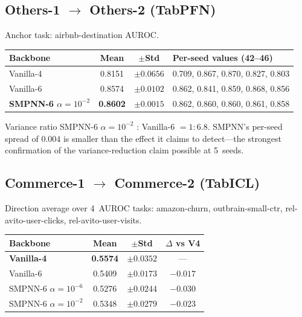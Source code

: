 \documentclass{article}
\begin{document}
\subsection{Others-1 $\to$ Others-2 (TabPFN)}
Anchor task: airbnb-destination AUROC.

\begin{table}[h]
  \centering
  \small
  \begin{tabular}{@{}lccL{5.2cm}@{}}
    \toprule
    Backbone                     & Mean   & $\pm$Std   & Per-seed values (42--46)              \\
    \midrule
    Vanilla-4                    & 0.8151 & $\pm 0.0656$ & 0.709, 0.867, 0.870, 0.827, 0.803    \\
    Vanilla-6                    & 0.8574 & $\pm 0.0102$ & 0.862, 0.841, 0.859, 0.868, 0.856    \\
    \textbf{SMPNN-6 $\alpha{=}10^{-2}$} & \textbf{0.8602} & \textbf{$\pm 0.0015$} & 0.862, 0.860, 0.860, 0.861, 0.858 \\
    \bottomrule
  \end{tabular}
\end{table}

Variance ratio SMPNN-6 $\alpha{=}10^{-2}$ : Vanilla-6 $= 1 : 6.8$. SMPNN's per-seed spread of $0.004$ is smaller than the effect it claims to detect---the strongest confirmation of the variance-reduction claim possible at 5~seeds.

\subsection{Commerce-1 $\to$ Commerce-2 (TabICL)}
Direction average over 4~AUROC tasks: amazon-churn, outbrain-small-ctr, rel-avito-user-clicks, rel-avito-user-visits.

\begin{table}[h]
  \centering
  \small
  \begin{tabular}{@{}lccc@{}}
    \toprule
    Backbone                        & Mean   & $\pm$Std   & $\Delta$ vs V4 \\
    \midrule
    \textbf{Vanilla-4}              & \textbf{0.5574} & $\pm 0.0352$ & ---          \\
    Vanilla-6                       & 0.5409 & $\pm 0.0173$ & $-0.017$     \\
    SMPNN-6 $\alpha{=}10^{-6}$      & 0.5276 & $\pm 0.0244$ & $-0.030$     \\
    SMPNN-6 $\alpha{=}10^{-2}$      & 0.5348 & $\pm 0.0279$ & $-0.023$     \\
    \bottomrule
  \end{tabular}
\end{table}
\end{document}
